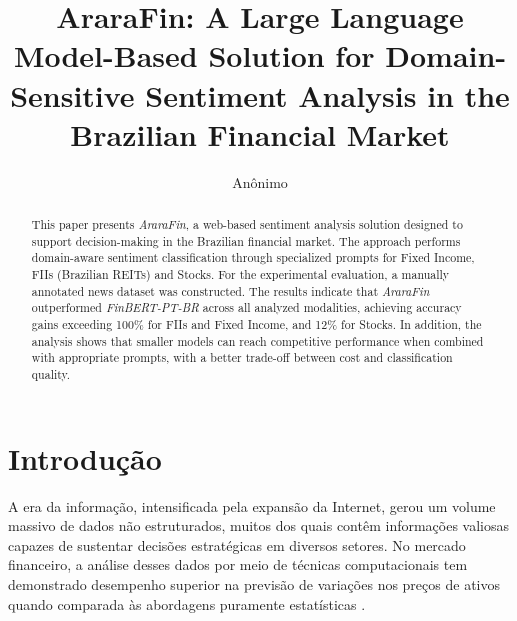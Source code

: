 \documentclass[12pt]{article}
\title{AraraFin: A Large Language Model-Based Solution for Domain-Sensitive Sentiment Analysis in the Brazilian Financial Market}
\author{Anônimo\inst{1}}
\begin{document}
 

\maketitle

\begin{abstract}
This paper presents \textit{AraraFin}, a web-based sentiment analysis solution designed to support decision-making in the Brazilian financial market. The approach performs domain-aware sentiment classification through specialized prompts for Fixed Income, FIIs (Brazilian REITs) and Stocks. For the experimental evaluation, a manually annotated news dataset was constructed. The results indicate that \textit{AraraFin} outperformed \textit{FinBERT-PT-BR} across all analyzed modalities, achieving accuracy gains exceeding 100\% for FIIs and Fixed Income, and 12\% for Stocks. In addition, the analysis shows that smaller models can reach competitive performance when combined with appropriate prompts, with a better trade-off between cost and classification quality.
\end{abstract}



\section{Introdução}

A era da informação, intensificada pela expansão da Internet, gerou um volume massivo de dados não estruturados, muitos dos quais contêm informações valiosas capazes de sustentar decisões estratégicas em diversos setores. No mercado financeiro, a análise desses dados por meio de técnicas computacionais tem demonstrado desempenho superior na previsão de variações nos preços de ativos quando comparada às abordagens puramente estatísticas \cite{darwish2025stockforecasting}.
\end{document}
